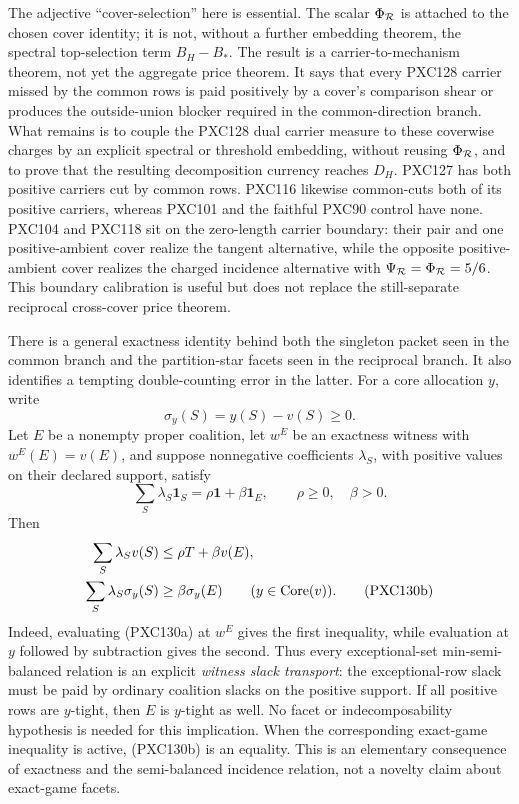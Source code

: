 \documentclass[11pt]{article}
\newcommand{\one}{\mathbf 1}
\begin{document}
The adjective ``cover-selection'' here is essential.  The scalar
$\Phi_{\cal R}$ is attached to the chosen cover identity; it is not, without
a further embedding theorem, the spectral top-selection term $B_H-B_*$.  The
result is a carrier-to-mechanism theorem, not yet the aggregate price
theorem.  It says that every PXC128 carrier missed by the common rows is
paid positively by a cover's comparison shear or produces the
outside-union blocker required in the common-direction branch.  What remains
is to couple the PXC128 dual carrier measure to these coverwise charges by
an explicit spectral or threshold embedding, without reusing
$\Phi_{\cal R}$, and to prove that the resulting decomposition currency
reaches $D_H$.  PXC127 has both positive carriers cut by
common rows.  PXC116 likewise common-cuts both of its positive carriers,
whereas PXC101 and the faithful PXC90 control have none.  PXC104 and PXC118
sit on the zero-length carrier boundary: their pair and one positive-ambient
cover realize the tangent alternative, while the opposite positive-ambient
cover realizes the charged incidence alternative with
$\Psi_{\cal R}=\Phi_{\cal R}=5/6$.  This boundary calibration is useful but
does not replace the still-separate reciprocal cross-cover price theorem.

There is a general exactness identity behind both the singleton packet seen
in the common branch and the partition-star facets seen in the reciprocal
branch.  It also identifies a tempting double-counting error in the latter.
For a core allocation $y$, write
\[
                 \sigma_y(S)=y(S)-v(S)\ge0.
\]
Let $E$ be a nonempty proper coalition, let $w^E$ be an exactness witness
with $w^E(E)=v(E)$, and suppose nonnegative coefficients $\lambda_S$, with
positive values on their declared support, satisfy
\begin{equation}
 \sum_S\lambda_S\one_S
   =\rho\one+\beta\one_E,
 \qquad \rho\ge0,\quad\beta>0.                    \tag{PXC130a}
\end{equation}
Then
\begin{align}
 \sum_S\lambda_Sv(S)&\le \rho T+\beta v(E),\notag\\
 \sum_S\lambda_S\sigma_y(S)&\ge
              \beta\sigma_y(E)\qquad(y\in\operatorname{Core}(v)).
                                                               \tag{PXC130b}
\end{align}
Indeed, evaluating (PXC130a) at $w^E$ gives the first inequality, while
evaluation at $y$ followed by subtraction gives the second.  Thus every
exceptional-set min-semi-balanced relation is an explicit
\emph{witness slack transport}: the exceptional-row slack must be paid by
ordinary coalition slacks on the positive support.  If all positive rows
are $y$-tight, then $E$ is $y$-tight as well.  No facet or
indecomposability hypothesis is needed for this implication.  When the
corresponding exact-game inequality is active, (PXC130b) is an equality.
This is an elementary consequence of exactness and the semi-balanced
incidence relation, not a novelty claim about exact-game facets.
\end{document}
